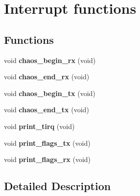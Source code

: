 \hypertarget{group__chaos__interrupts}{\section{Interrupt functions}
\label{group__chaos__interrupts}
}
\subsection*{Functions}
\begin{DoxyCompactItemize}
\item 
\hypertarget{group__chaos__interrupts_ga8f75a32d8b354934163c8eb70841590f}{void {\bfseries chaos\-\_\-begin\-\_\-rx} (void)}\label{group__chaos__interrupts_ga8f75a32d8b354934163c8eb70841590f}

\item 
\hypertarget{group__chaos__interrupts_gaa5045bdacc2f1ea6e4b04c7a19649c48}{void {\bfseries chaos\-\_\-end\-\_\-rx} (void)}\label{group__chaos__interrupts_gaa5045bdacc2f1ea6e4b04c7a19649c48}

\item 
\hypertarget{group__chaos__interrupts_gada53a7a38863b33ed5038d808a8f4ff5}{void {\bfseries chaos\-\_\-begin\-\_\-tx} (void)}\label{group__chaos__interrupts_gada53a7a38863b33ed5038d808a8f4ff5}

\item 
\hypertarget{group__chaos__interrupts_ga3ca8eca1033538551e79f4823d963ee0}{void {\bfseries chaos\-\_\-end\-\_\-tx} (void)}\label{group__chaos__interrupts_ga3ca8eca1033538551e79f4823d963ee0}

\item 
\hypertarget{group__chaos__interrupts_gae6921825b655971fe89c74a6f0c42262}{void {\bfseries print\-\_\-tirq} (void)}\label{group__chaos__interrupts_gae6921825b655971fe89c74a6f0c42262}

\item 
\hypertarget{group__chaos__interrupts_ga834e38553fc06e089a762cfa3b8bf093}{void {\bfseries print\-\_\-flags\-\_\-tx} (void)}\label{group__chaos__interrupts_ga834e38553fc06e089a762cfa3b8bf093}

\item 
\hypertarget{group__chaos__interrupts_ga5e84271255a7a9c0fa043c0300c3ab5e}{void {\bfseries print\-\_\-flags\-\_\-rx} (void)}\label{group__chaos__interrupts_ga5e84271255a7a9c0fa043c0300c3ab5e}

\end{DoxyCompactItemize}


\subsection{Detailed Description}
